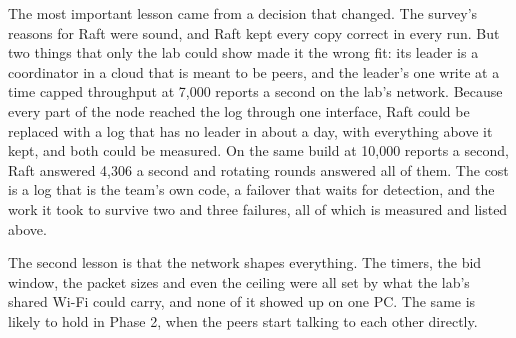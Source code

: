 The most important lesson came from a decision that changed. The survey's reasons for Raft were sound, and Raft kept every copy correct in every run. But two things that only the lab could show made it the wrong fit: its leader is a coordinator in a cloud that is meant to be peers, and the leader's one write at a time capped throughput at 7,000 reports a second on the lab's network. Because every part of the node reached the log through one interface, Raft could be replaced with a log that has no leader in about a day, with everything above it kept, and both could be measured. On the same build at 10,000 reports a second, Raft answered 4,306 a second and rotating rounds answered all of them. The cost is a log that is the team's own code, a failover that waits for detection, and the work it took to survive two and three failures, all of which is measured and listed above.

The second lesson is that the network shapes everything. The timers, the bid window, the packet sizes and even the ceiling were all set by what the lab's shared Wi-Fi could carry, and none of it showed up on one PC. The same is likely to hold in Phase 2, when the peers start talking to each other directly.

